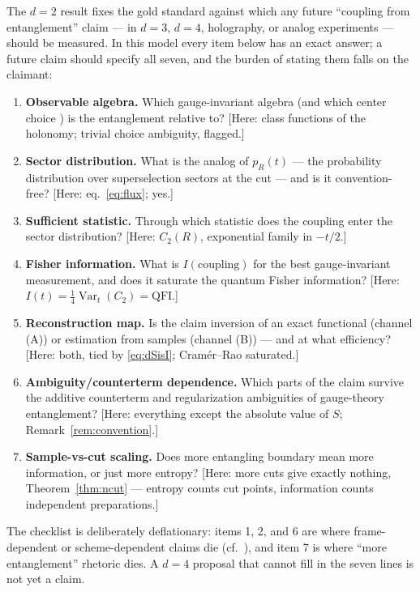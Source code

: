 \documentclass[11pt]{article}
\theoremstyle{remark}
\theoremstyle{plain}
\newcommand{\Var}{\operatorname{Var}}
\begin{document}
The $d = 2$ result fixes the gold standard against which any future ``coupling from entanglement'' claim --- in $d = 3$, $d = 4$, holography, or analog experiments --- should be measured. In this model every item below has an exact answer; a future claim should specify all seven, and the burden of stating them falls on the claimant:

\begin{enumerate}
\item \textbf{Observable algebra.} Which gauge-invariant algebra (and which center choice \cite{CHR}) is the entanglement relative to? [Here: class functions of the holonomy; trivial choice ambiguity, flagged.]
\item \textbf{Sector distribution.} What is the analog of $p_R(t)$ --- the probability distribution over superselection sectors at the cut --- and is it convention-free? [Here: eq.~\eqref{eq:flux}; yes.]
\item \textbf{Sufficient statistic.} Through which statistic does the coupling enter the sector distribution? [Here: $C_2(R)$, exponential family in $-t/2$.]
\item \textbf{Fisher information.} What is $I(\text{coupling})$ for the best gauge-invariant measurement, and does it saturate the quantum Fisher information? [Here: $I(t) = \tfrac14\Var_t(C_2) = \mathrm{QFI}$.]
\item \textbf{Reconstruction map.} Is the claim inversion of an exact functional (channel (A)) or estimation from samples (channel (B)) --- and at what efficiency? [Here: both, tied by \eqref{eq:dSisI}; Cram\'er--Rao saturated.]
\item \textbf{Ambiguity/counterterm dependence.} Which parts of the claim survive the additive counterterm and regularization ambiguities of gauge-theory entanglement? [Here: everything except the absolute value of $S$; Remark~\ref{rem:convention}.]
\item \textbf{Sample-vs-cut scaling.} Does more entangling boundary mean more information, or just more entropy? [Here: more cuts give exactly nothing, Theorem~\ref{thm:ncut} --- entropy counts cut points, information counts independent preparations.]
\end{enumerate}

The checklist is deliberately deflationary: items 1, 2, and 6 are where frame-dependent or scheme-dependent claims die (cf.~\cite{P1, P2}), and item 7 is where ``more entanglement'' rhetoric dies. A $d = 4$ proposal that cannot fill in the seven lines is not yet a claim.
\end{document}
